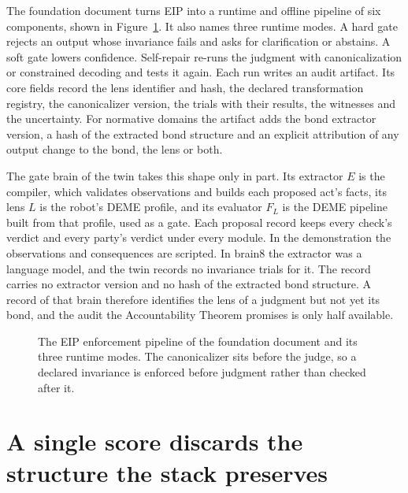 The foundation document turns EIP into a runtime and offline pipeline of six components, shown in
Figure~\ref{fig:pe-eip}. It also names three runtime modes. A hard gate rejects an output whose
invariance fails and asks for clarification or abstains. A soft gate lowers confidence. Self-repair
re-runs the judgment with canonicalization or constrained decoding and tests it again.
Each run writes an audit artifact. Its core fields record the lens identifier and hash, the
declared transformation registry, the canonicalizer version, the trials with their results, the
witnesses and the uncertainty. For normative domains the artifact adds the bond extractor
version, a hash of the extracted bond structure and an explicit attribution of any output change
to the bond, the lens or both.

The gate brain of the twin takes this shape only in part. Its extractor $E$ is the compiler, which
validates observations and builds each proposed act's facts, its lens $L$ is the robot's DEME
profile, and its evaluator $F_L$ is the DEME pipeline built from that profile, used as a gate.
Each proposal record keeps every check's verdict and every party's verdict under every module.
In the demonstration the observations and consequences are scripted. In brain8 the extractor was a
language model, and the twin records no invariance trials for it. The record
carries no extractor version and no hash of the extracted bond structure. A record of that brain therefore identifies the lens of a judgment but not yet its
bond, and the audit the Accountability Theorem promises is only half available.

\begin{figure}[t]
\centering

\caption{The EIP enforcement pipeline of the foundation document and its three runtime modes.
The canonicalizer sits before the judge, so a declared invariance is enforced before judgment
rather than checked after it.}
\label{fig:pe-eip}
\end{figure}

\section{A single score discards the structure the stack preserves}\label{sec:pe-scalar}

